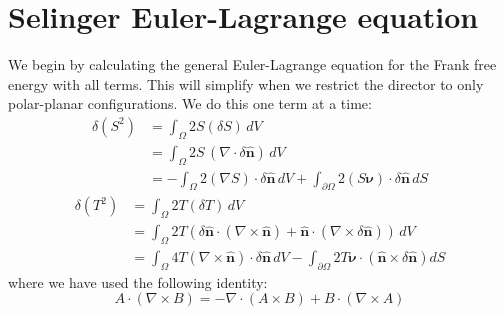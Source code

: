 \documentclass[reqno]{article}
\newcommand{\n}{\hat{\mathbf{n}}}
\begin{document}
\section{Selinger Euler-Lagrange equation}

We begin by calculating the general Euler-Lagrange equation for the Frank free energy with all terms.
This will simplify when we restrict the director to only polar-planar configurations.
We do this one term at a time:
\begin{equation}
\begin{split}
    \delta (S^2)
    &=
    \int_{\Omega} 2 S \left( \delta S \right) \, dV \\
    &=
    \int_{\Omega} 2S \, \left( \nabla \cdot \delta \n \right) \, dV \\
    &=
    -\int_{\Omega} 2\left(\nabla S \right) \cdot \delta \n \, dV
    + \int_{\partial \Omega} 2 \left( S  \boldsymbol\nu \right) \cdot \delta \n  \, dS
\end{split}
\end{equation}
\begin{equation}
\begin{split}
    \delta (T^2)
    &=
    \int_{\Omega} 2T \left( \delta T \right) \, dV \\
    &=
    \int_{\Omega} 2T \left( 
        \delta \n \cdot \left( \nabla \times \n \right)
        + \n \cdot \left( \nabla \times \delta \n \right)
    \right) \, dV \\
    &=
    \int_{\Omega} 4T \left( \nabla \times \n \right) \cdot \delta \n \, dV
    -
    \int_{\partial \Omega} 2T \boldsymbol\nu \cdot \left(\n \times \delta \n\right) dS
\end{split}
\end{equation}
where we have used the following identity:
\begin{equation}
    A \cdot \left( \nabla \times B \right)
    =
    -\nabla \cdot \left(A \times B\right)
    + B \cdot \left( \nabla \times A \right)
\end{equation}
\end{document}
